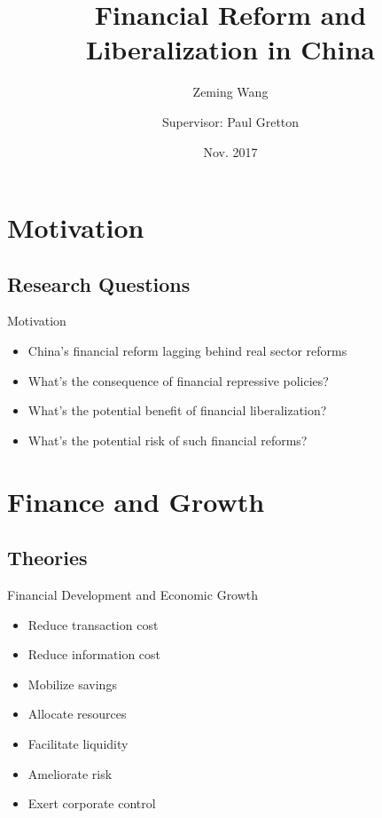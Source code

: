\documentclass{beamer}
\title{Financial Reform and Liberalization in China}
\author{
    Zeming Wang\inst{1} \and 
    Supervisor: Paul Gretton\inst{2}
    }
\institute[] %
{
  \inst{1}%
  College of Business and Economics
  \and
  \inst{2}%
  East Asian Bureau of Economic Research
}
\date{Nov. 2017}
\begin{document}
\begin{frame}
  \titlepage
\end{frame}


\section{Motivation}
\subsection{Research Questions}

\begin{frame}{Motivation}
\begin{itemize}
\item China's financial reform lagging behind real sector reforms
\item What's the consequence of financial repressive policies?
\item What's the potential benefit of financial liberalization?
\item What's the potential risk of such financial reforms?
\end{itemize}
\end{frame}

\section{Finance and Growth}
\subsection{Theories}
\begin{frame}{Financial Development and Economic Growth}
\begin{itemize}
\item Reduce transaction cost
\item Reduce information cost
\item Mobilize savings
\item Allocate resources
\item Facilitate liquidity
\item Ameliorate risk
\item Exert corporate control
\end{itemize}
\end{frame}
\end{document}
